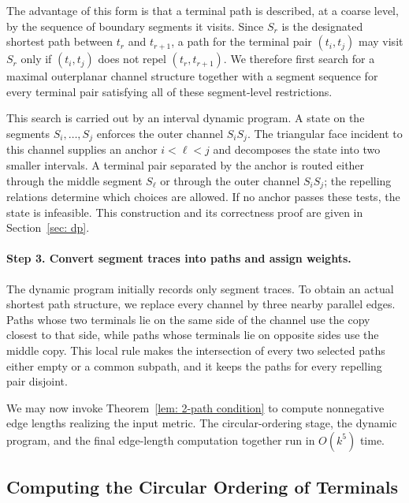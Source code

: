 \documentclass[11pt]{article}
\begin{document}
The advantage of this form is that a terminal path is described, at a coarse level, by the sequence of boundary segments it visits. Since $S_r$ is the designated shortest path between $t_r$ and $t_{r+1}$, a path for the terminal pair $(t_i,t_j)$ may visit $S_r$ only if $(t_i,t_j)$ does not repel $(t_r,t_{r+1})$. We therefore first search for a maximal outerplanar channel structure together with a segment sequence for every terminal pair satisfying all of these segment-level restrictions.

This search is carried out by an interval dynamic program. A state on the segments $S_i,\ldots,S_j$ enforces the outer channel $S_iS_j$. The triangular face incident to this channel supplies an anchor $i<\ell<j$ and decomposes the state into two smaller intervals. A terminal pair separated by the anchor is routed either through the middle segment $S_\ell$ or through the outer channel $S_iS_j$; the repelling relations determine which choices are allowed. If no anchor passes these tests, the state is infeasible. This construction and its correctness proof are given in Section~\ref{sec: dp}.

\paragraph{Step 3. Convert segment traces into paths and assign weights.}
The dynamic program initially records only segment traces. To obtain an actual shortest path structure, we replace every channel by three nearby parallel edges. Paths whose two terminals lie on the same side of the channel use the copy closest to that side, while paths whose terminals lie on opposite sides use the middle copy. This local rule makes the intersection of every two selected paths either empty or a common subpath, and it keeps the paths for every repelling pair disjoint.

We may now invoke Theorem~\ref{lem: 2-path condition} to compute nonnegative edge lengths realizing the input metric. The circular-ordering stage, the dynamic program, and the final edge-length computation together run in $O(k^5)$ time.

\subsection{Computing the Circular Ordering of Terminals}
\label{sec: ordering}
\end{document}
